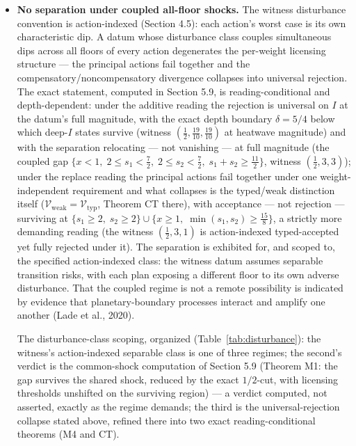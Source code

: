 \documentclass[3p,11pt]{elsarticle}
\begin{document}
\begin{itemize}
  \(\mathcal{V}_{\mathrm{typ}} \subseteq \mathcal{V}_{\mathrm{weak}} \subseteq \mathcal{V}_{\mathrm{phys}}\)
  is a theorem about the defined operators under common action and
  disturbance classes, common safe-set inclusion, common horizon, common
  tube semantics, and common terminal condition. It does not establish a
  universal ranking of endpoint, weak, and strong sustainability
  doctrines.
\item
  \textbf{No separation under coupled all-floor shocks.} The witness
  disturbance convention is action-indexed (Section 4.5): each action's
  worst case is its own characteristic dip. A datum whose disturbance
  class couples simultaneous dips across all floors of every action
  degenerates the per-weight licensing structure --- the principal
  actions fail together and the compensatory/noncompensatory divergence
  collapses into universal rejection. The exact statement, computed in
  Section 5.9, is reading-conditional and depth-dependent: under the
  additive reading the rejection is universal on \(I\) at the datum's
  full magnitude, with the exact depth boundary \(\delta = 5/4\) below
  which deep-\(I\) states survive (witness \((\tfrac12,
  \tfrac{19}{10}, \tfrac{19}{10})\) at heatwave magnitude) and with the
  separation relocating --- not vanishing --- at full magnitude (the
  coupled gap \(\{ x < 1,\; 2 \le s_1 < \tfrac72,\; 2 \le s_2 <
  \tfrac72,\; s_1 + s_2 \ge \tfrac{11}{2} \}\), witness \((\tfrac12,
  3, 3)\)); under the replace reading the principal actions fail
  together under one weight-independent requirement and what collapses
  is the typed/weak distinction itself (\(\mathcal{V}_{\mathrm{weak}} =
  \mathcal{V}_{\mathrm{typ}}\), Theorem CT there), with acceptance ---
  not rejection --- surviving at \(\{ s_1 \ge 2,\; s_2 \ge 2 \} \cup
  \{ x \ge 1,\; \min(s_1, s_2) \ge \tfrac{15}{8} \}\), a strictly
  more demanding reading (the witness \((\tfrac12, 3, 1)\) is
  action-indexed typed-accepted yet fully rejected under it). The
  separation is exhibited for, and scoped to, the specified
  action-indexed class: the witness datum assumes separable transition risks, with each plan exposing a different floor to its own adverse disturbance. That the coupled regime is not a remote possibility is indicated by evidence that planetary-boundary processes interact and amplify one another (Lade et al., 2020).

\medskip

\noindent The disturbance-class scoping, organized
(Table~\ref{tab:disturbance}): the witness's action-indexed separable
class is one of three regimes; the second's verdict is the common-shock
computation of Section 5.9 (Theorem M1: the gap survives the shared
shock, reduced by the exact \(1/2\)-cut, with licensing thresholds
unshifted on the surviving region) --- a verdict computed, not asserted,
exactly as the regime demands; the third is the universal-rejection
collapse stated above, refined there into two exact reading-conditional
theorems (M4 and CT).


\end{itemize}
\end{document}

